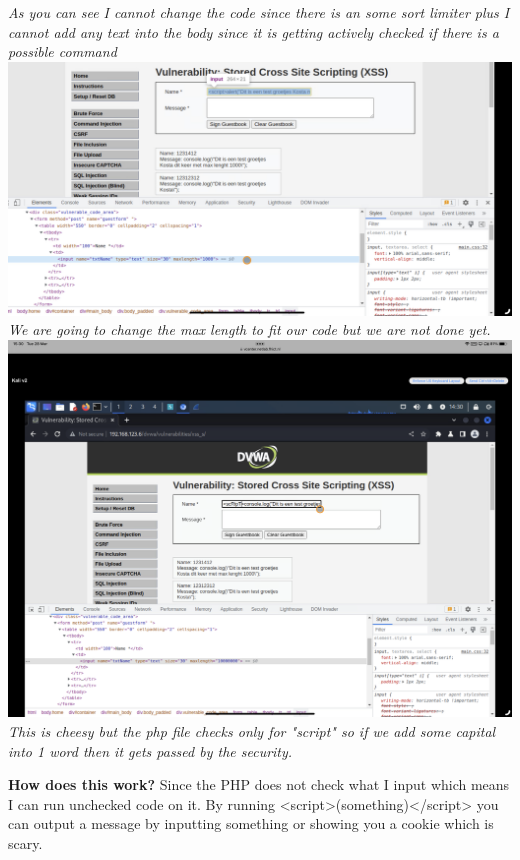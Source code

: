 \documentclass[12pt, letterpaper]{article}
\begin{document}
\break
\emph{As you can see I cannot change the code since there is an some sort limiter plus I cannot add any text into the body since it is getting actively checked if there is a possible command}
\hfill\break
\hfill\break
\includegraphics{fotos/Week 4/Xss/Stored/Medium/Change lenth.jpeg}
\break
\emph{We are going to change the max length to fit our code but we are not done yet.}
\hfill\break
\hfill\break
\includegraphics{fotos/Week 4/Xss/Stored/Medium/Change the word script.png}
\break
\emph{This is cheesy but the php file checks only for "script" so if we add some capital into 1 word then it gets passed by the security.}


\hfill\break
\hfill\break
\textbf{How does this work?}
\hfill\break
Since the PHP does not check what I input which means I can run unchecked code on it. By running <script>(something)</script> you can output a message by inputting something or showing you a cookie which is scary.
\hfill\break
\newpage
\end{document}
